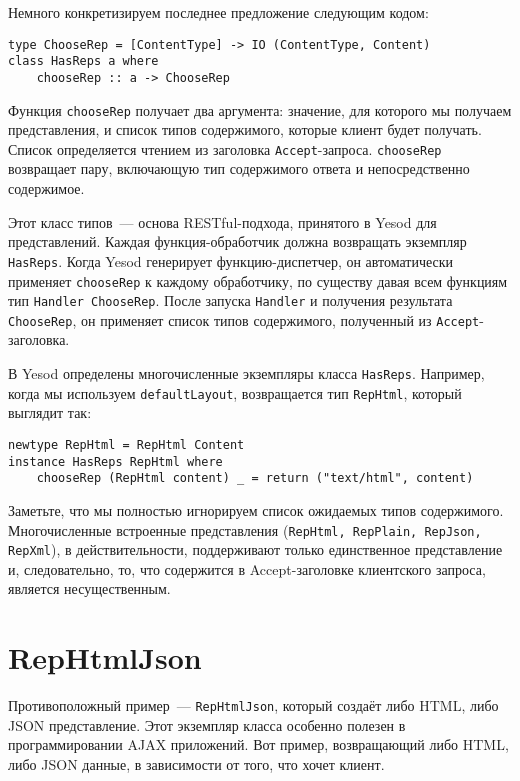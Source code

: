 Немного конкретизируем последнее предложение следующим кодом:

\begin{lstlisting}
type ChooseRep = [ContentType] -> IO (ContentType, Content)
class HasReps a where
    chooseRep :: a -> ChooseRep
\end{lstlisting}

Функция \lstinline'chooseRep' получает два аргумента: значение, для которого мы получаем
представления, и список типов содержимого, которые клиент будет получать. Список
определяется чтением из заголовка \verb*|Accept|-запроса. \lstinline'chooseRep' возвращает
пару,
включающую тип содержимого ответа и непосредственно содержимое.

Этот класс типов~--- основа RESTful-подхода, принятого в Yesod для представлений. Каждая
функция-обработчик должна возвращать экземпляр \lstinline'HasReps'. Когда Yesod генерирует
функцию-диспетчер, он автоматически применяет \lstinline'chooseRep' к каждому обработчику,
по существу давая всем функциям тип \lstinline'Handler ChooseRep'. После  запуска
\lstinline'Handler' и получения результата \lstinline'ChooseRep',  он применяет список
типов содержимого, полученный из \verb*|Accept|-заголовка.

В Yesod определены многочисленные экземпляры класса \lstinline'HasReps'. Например, когда
мы используем \lstinline'defaultLayout', возвращается тип \lstinline'RepHtml', который
выглядит так:

\begin{lstlisting}
newtype RepHtml = RepHtml Content
instance HasReps RepHtml where
    chooseRep (RepHtml content) _ = return ("text/html", content)
\end{lstlisting}

Заметьте, что мы полностью игнорируем список ожидаемых типов содержимого. Многочисленные встроенные представления (\lstinline'RepHtml, RepPlain, RepJson, RepXml'), в действительности, поддерживают только единственное представление и, следовательно, то, что содержится в Accept-заголовке клиентского запроса, является несущественным.

\section{RepHtmlJson}

Противоположный пример~--- \lstinline'RepHtmlJson', который создаёт либо HTML, либо JSON
представление. Этот экземпляр класса особенно полезен в программировании AJAX приложений.
Вот пример, возвращающий либо HTML, либо JSON данные, в зависимости от того, что хочет
клиент.

